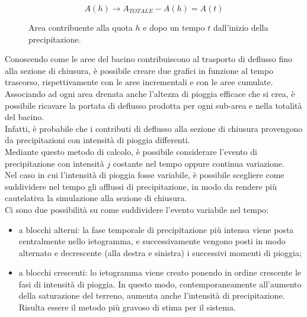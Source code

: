 \begin{figure}[H]
\begin{equation}
    A(h) \rightarrow A_{TOTALE} - A(h) = A(t)
    \label{Acontribuzione_tprecipitazione}
\end{equation}
\caption*{Area contribuente alla quota $h$ e dopo un tempo $t$ dall'inizio della precipitazione.}
\end{figure}

Conoscendo come le aree del bacino contribuiscono al trasporto di deflusso fino alla sezione di chiusura, è possibile creare due grafici in funzione al tempo trascorso, rispettivamente con le aree incrementali e con le aree cumulate.\\
Associando ad ogni area drenata anche l'altezza di pioggia efficace che si crea, è possibile ricavare la portata di deflusso prodotta per ogni sub-area e nella totalità del bacino.\\
Infatti, è probabile che i contributi di deflusso alla sezione di chiusura provengono da precipitazioni con intensità di pioggia differenti.\\
Mediante questo metodo di calcolo, è possibile considerare l'evento di precipitazione con intensità $j$ costante nel tempo oppure continua variazione.\\
Nel caso in cui l'intensità di pioggia fosse variabile, è possibile scegliere come suddividere nel tempo gli afflussi di precipitazione, in modo da rendere più cautelativa la simulazione alla sezione di chiusura.\\
Ci sono due possibilità su come suddividere l'evento variabile nel tempo:
\begin{itemize}
    \item a blocchi alterni: la fase temporale di precipitazione più intensa viene posta centralmente nello ietogramma, e successivamente vengono posti in modo alternato e decrescente (alla destra e sinistra) i successivi momenti di pioggia;
    \item a blocchi crescenti: lo ietogramma viene creato ponendo in ordine crescente le fasi di intensità di pioggia. In questo modo, contemporaneamente all'aumento della saturazione del terreno, aumenta anche l'intensità di precipitazione. Risulta essere il metodo più gravoso di stima per il sistema. 
\end{itemize}


